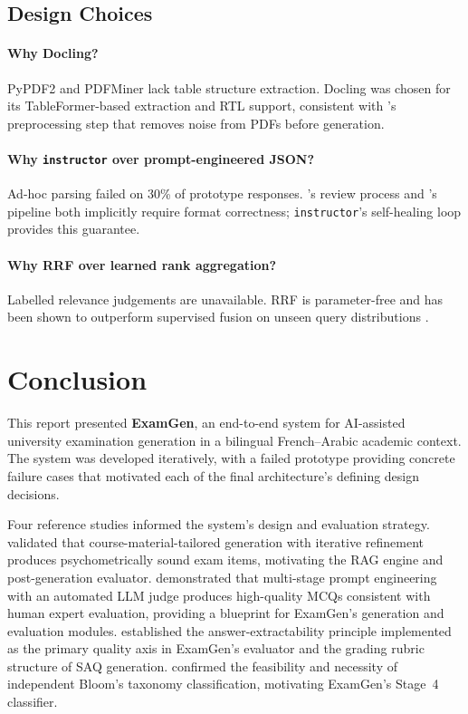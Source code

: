 \documentclass[12pt, a4paper]{article}
\begin{document}
\subsection{Design Choices}

\paragraph{Why Docling?}
PyPDF2 and PDFMiner lack table structure extraction. Docling was chosen for its
TableFormer-based extraction and RTL support, consistent with \citet{mucciaccia2025mcq}'s
preprocessing step that removes noise from PDFs before generation.

\paragraph{Why \texttt{instructor} over prompt-engineered JSON?}
Ad-hoc parsing failed on 30\% of prototype responses.
\citet{mucciaccia2025mcq}'s review process and \citet{morris2024aqg}'s pipeline both
implicitly require format correctness; \texttt{instructor}'s self-healing loop
provides this guarantee.

\paragraph{Why RRF over learned rank aggregation?}
Labelled relevance judgements are unavailable. RRF is parameter-free and has been
shown to outperform supervised fusion on unseen query distributions \cite{cormack2009rrf}.

\section{Conclusion}
\label{sec:conclusion}

This report presented \textbf{ExamGen}, an end-to-end system for AI-assisted
university examination generation in a bilingual French--Arabic academic context.
The system was developed iteratively, with a failed prototype providing concrete
failure cases that motivated each of the final architecture's defining design decisions.

Four reference studies informed the system's design and evaluation strategy.
\citet{isley2025quality} validated that course-material-tailored generation with
iterative refinement produces psychometrically sound exam items, motivating the
RAG engine and post-generation evaluator. \citet{mucciaccia2025mcq} demonstrated
that multi-stage prompt engineering with an automated LLM judge produces high-quality
MCQs consistent with human expert evaluation, providing a blueprint for ExamGen's
generation and evaluation modules. \citet{morris2024aqg} established the
answer-extractability principle implemented as the primary quality axis in ExamGen's
evaluator and the grading rubric structure of SAQ generation. \citet{meissner2024itemforge}
confirmed the feasibility and necessity of independent Bloom's taxonomy classification,
motivating ExamGen's Stage~4 classifier.
\end{document}
